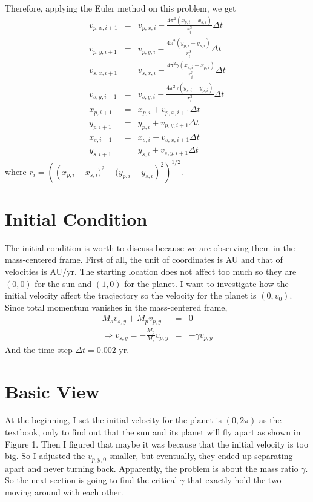 \documentclass{article}
\begin{document}
Therefore, applying the  Euler method on this problem, we get
\begin{eqnarray*}
	v_{p,x,i+1} &=& v_{p,x,i}-\frac{4\pi^2\left(x_{p,i}-x_{s,i}\right)}{r_i^3}\Delta t\\
	v_{p,y,i+1} &=& v_{p,y,i}-\frac{4\pi^2\left(y_{p,i}-y_{s,i}\right)}{r_i^3}\Delta t\\
	v_{s,x,i+1} &=& v_{s,x,i}-\frac{4\pi^2\gamma \left(x_{s,i}-x_{p,i}\right)}{r_i^3}\Delta t\\
	v_{s,y,i+1} &=& v_{s,y,i}-\frac{4\pi^2\gamma \left(y_{s,i}-y_{p,i}\right)}{r_i^3}\Delta t\\
	x_{p,i+1} &=& x_{p,i}+v_{p,x,i+1}\Delta t\\
	y_{p,i+1} &=& y_{p,i}+v_{p,y,i+1}\Delta t\\
	x_{s,i+1} &=& x_{s,i}+v_{s,x,i+1}\Delta t\\
	y_{s,i+1} &=& y_{s,i}+v_{s,y,i+1}\Delta t
\end{eqnarray*}
where $r_i=\left(\left(x_{p,i}-x_{s,i})^2+(y_{p,i}-y_{s,i}\right)^2\right)^{1/2}$.\\

\section{Initial Condition}
The initial condition is worth to discuss because we are observing them in the mass-centered frame.
First of all, the unit of coordinates is AU and that of velocities is AU$/$yr. The starting location does not affect too much so they are $(0,0)$ for the sun and $(1,0)$ for the planet. I want to investigate how the initial velocity affect the tracjectory so the velocity for the planet is $(0,v_0)$. Since total momentum vanishes in the mass-centered frame,
\begin{eqnarray*}
	M_sv_{s,y}+M_pv_{p,y}&=&0\\
	\Rightarrow v_{s,y} = -\frac{M_p}{M_s}v_{p,y}&=&-\gamma v_{p,y}
\end{eqnarray*}
And the time step $\Delta t=0.002$ yr.\\
\newpage
\section{Basic View}
At the beginning, I set the initial velocity for the planet is $(0,2\pi)$ as the textbook, only to find out that the sun and its planet will fly apart as shown in Figure 1. Then I figured that maybe it was because that the initial velocity is too big. So I adjusted the $v_{p,y,0}$ smaller, but eventually, they ended up separating apart and never turning back.
Apparently, the problem is about the mass ratio $\gamma$. So the next section is going to find the critical $\gamma$ that exactly hold the two moving around with each other.\\
\end{document}
